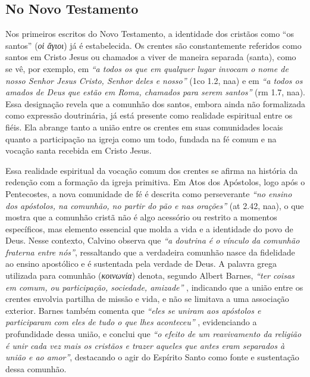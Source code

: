 \subsection{No Novo Testamento}

Nos primeiros escritos do Novo Testamento, a identidade dos cristãos como ``os santos'' (\textit{\foreignlanguage{greek}{οἱ ἅγιοι}}) já é estabelecida. Os crentes são constantemente referidos como santos em Cristo Jesus ou chamados a viver de maneira separada (santa), como se vê, por exemplo, em \textit{``a todos os que em qualquer lugar invocam o nome de nosso Senhor Jesus Cristo, Senhor deles e nosso''} (\gls{1co} 1.2, \gls{naa}) e em \textit{``a todos os amados de Deus que estão em Roma, chamados para serem santos''} (\gls{rm} 1.7, \gls{naa}). Essa designação revela que a comunhão dos santos, embora ainda não formalizada como expressão doutrinária, já está presente como realidade espiritual entre os fiéis. Ela abrange tanto a união entre os crentes em suas comunidades locais quanto a participação na igreja como um todo, fundada na fé comum e na vocação santa recebida em Cristo Jesus.

Essa realidade espiritual da vocação comum dos crentes se afirma na história da redenção com a formação da igreja primitiva. Em Atos dos Apóstolos, logo após o Pentecostes, a nova comunidade de fé é descrita como perseverante \textit{``no ensino dos apóstolos, na comunhão, no partir do pão e nas orações''} (\gls{at} 2.42, \gls{naa}), o que mostra que a comunhão cristã não é algo acessório ou restrito a momentos específicos, mas elemento essencial que molda a vida e a identidade do povo de Deus. Nesse contexto, Calvino observa que \textit{``a doutrina é o vínculo da comunhão fraterna entre nós''}\cite{calvinoAtos2}, ressaltando que a verdadeira comunhão nasce da fidelidade ao ensino apostólico e é sustentada pela verdade de Deus. A palavra grega utilizada para comunhão (\textit{κοινωνία}) denota, segundo Albert Barnes, \textit{``ter coisas em comum, ou participação, sociedade, amizade''} \cite{barnesAtos2}, indicando que a união entre os crentes envolvia partilha de missão e vida, e não se limitava a uma associação exterior. Barnes também comenta que \textit{``eles se uniram aos apóstolos e participaram com eles de tudo o que lhes aconteceu''} \cite{barnesAtos2}, evidenciando a profundidade dessa união, e conclui que \textit{``o efeito de um reavivamento da religião é unir cada vez mais os cristãos e trazer aqueles que antes eram separados à união e ao amor''}\cite{barnesAtos2}, destacando o agir do Espírito Santo como fonte e sustentação dessa comunhão.

